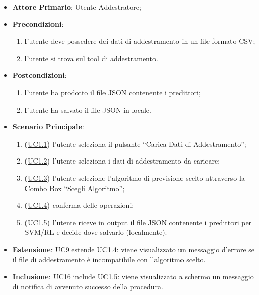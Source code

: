 		\begin{itemize}
			\item\textbf{Attore Primario}: Utente Addestratore;
			\item\textbf{Precondizioni}: 
				\begin{enumerate}
					\item l’utente deve possedere dei dati di addestramento in un file formato CSV;
					\item l’utente si trova sul tool di addestramento.
				\end{enumerate}
			\item\textbf{Postcondizioni}:
				\begin{enumerate}
					\item l’utente ha prodotto il file JSON contenente i predittori;
					\item l’utente ha salvato il file JSON in locale.
				\end{enumerate}
			\item\textbf{Scenario Principale}:
				\begin{enumerate}
					\item (\hyperref[par:UC1.1]{UC1.1}) l’utente seleziona il pulsante “Carica Dati di Addestramento”;
					\item (\hyperref[par:UC1.2]{UC1.2}) l’utente seleziona i dati di addestramento da caricare;
					\item (\hyperref[par:UC1.3]{UC1.3}) l’utente selezione l’algoritmo di previsione scelto attraverso la Combo Box “Scegli Algoritmo”; 
					\item (\hyperref[par:UC1.4]{UC1.4}) conferma delle operazioni; 
					\item (\hyperref[par:UC1.5]{UC1.5}) l’utente riceve in output il file JSON contenente i predittori per SVM/RL e decide dove salvarlo (localmente).  
				\end{enumerate}
			\item\textbf{Estensione}: \hyperref[par:UC9]{UC9} estende \hyperref[par:UC1.4]{UC1.4}: viene visualizzato un messaggio d’errore se il file di addestramento è incompatibile con l’algoritmo scelto. 
			\item\textbf{Inclusione}: \hyperref[par:UC16]{UC16} include \hyperref[par:UC1.5]{UC1.5}: viene visualizzato a schermo un messaggio di notifica di avvenuto successo della procedura.
		\end{itemize}
		
		\label{par:UC1.1}
